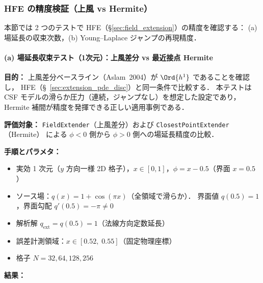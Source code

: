 \subsubsection{HFE の精度検証（上風 vs Hermite）}
\label{sec:verify_field_extension}
\label{sec:verify_gfm}%

本節では 2 つのテストで HFE（§\ref{sec:field_extension}）の精度を確認する：
(a) 場延長の収束次数，(b) Young--Laplace ジャンプの再現精度．


\paragraph{(a) 場延長収束テスト（1次元）：上風差分 vs 最近接点 Hermite}

\noindent\textbf{目的：}
上風差分ベースライン（Aslam~2004）が $\Ord{h^1}$ であることを確認し，
HFE（§~\ref{sec:extension_pde_disc}）と同一条件で比較する．
本テストは CSF モデルの滑らか圧力（連続，ジャンプなし）を想定した設定であり，
Hermite 補間が精度を発揮できる正しい適用事例である．

\noindent\textbf{評価対象：}
\texttt{FieldExtender}（上風差分）および \texttt{ClosestPointExtender}（Hermite）
による $\phi<0$ 側から $\phi>0$ 側への場延長精度の比較．

\noindent\textbf{手順とパラメタ：}
\begin{itemize}[noitemsep]
  \item 実効 1 次元（$y$ 方向一様 2D 格子），$x \in [0,1]$，$\phi = x - 0.5$（界面 $x = 0.5$）
  \item ソース場：$q(x) = 1 + \cos(\pi x)$（全領域で滑らか）．
        界面値 $q(0.5) = 1$，界面勾配 $q'(0.5) = -\pi \neq 0$
  \item 解析解 $q_{\text{ext}} = q(0.5) = 1$（法線方向定数延長）
  \item 誤差計測領域：$x \in [0.52,\; 0.55]$（固定物理座標）
  \item 格子 $N = 32, 64, 128, 256$
\end{itemize}

\noindent\textbf{結果：}

